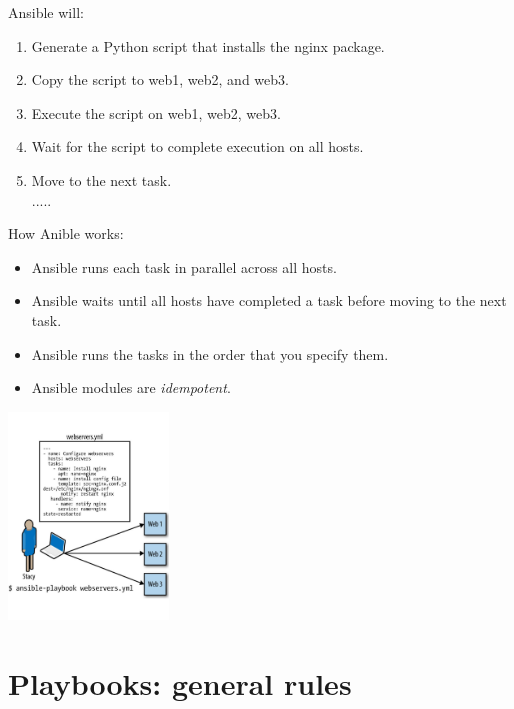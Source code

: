 \documentclass[pdf, 8pt, unicode, t]{beamer} %
\begin{document}
\begin{frame}
\hspace{2em}\alert{Ansible will:}

\begin{enumerate}
\addtolength{\itemindent}{1em}
\item Generate a Python script that installs the nginx package.
\item Copy the script to web1, web2, and web3.
\item Execute the script on web1, web2, web3.
\item Wait for the script to complete execution on all hosts.
\item Move to the next task.\\
.....
\end{enumerate}

\hspace{2em}\alert{How Anible works:}

\begin{itemize}
\item Ansible runs each task in parallel across all hosts.
\item Ansible waits until all hosts have completed a task before moving to the next task.
\item Ansible runs the tasks in the order that you specify them.
\item Ansible modules are {\it idempotent}.
\end{itemize}
\begin{center}
\vspace{-1.2em}
{\includegraphics[width=0.32\textwidth]{./images/scheme.pdf}}
\end{center}

\end{frame}


\section{Playbooks: general rules}
\end{document}
